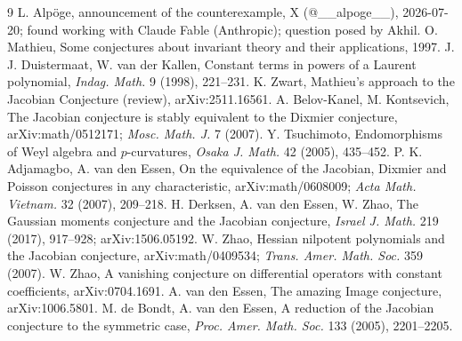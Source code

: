 \documentclass[11pt]{article}
\begin{document}
\begin{thebibliography}{9}
 L. Alp\"oge, announcement of the counterexample, X (@\_\_alpoge\_\_),
2026-07-20; found working with Claude Fable (Anthropic); question posed by Akhil.
 O. Mathieu, Some conjectures about invariant theory and their
applications, 1997.
 J. J. Duistermaat, W. van der Kallen, Constant terms in powers of a Laurent
polynomial, \emph{Indag. Math.} 9 (1998), 221--231.
 K. Zwart, Mathieu's approach to the Jacobian Conjecture (review),
arXiv:2511.16561.
 A. Belov-Kanel, M. Kontsevich, The Jacobian conjecture is stably equivalent
to the Dixmier conjecture, arXiv:math/0512171; \emph{Mosc. Math. J.} 7 (2007).
 Y. Tsuchimoto, Endomorphisms of Weyl algebra and $p$-curvatures,
\emph{Osaka J. Math.} 42 (2005), 435--452.
 P. K. Adjamagbo, A. van den Essen, On the equivalence of the Jacobian,
Dixmier and Poisson conjectures in any characteristic, arXiv:math/0608009; \emph{Acta Math.
Vietnam.} 32 (2007), 209--218.
 H. Derksen, A. van den Essen, W. Zhao, The Gaussian moments conjecture and
the Jacobian conjecture, \emph{Israel J. Math.} 219 (2017), 917--928; arXiv:1506.05192.
 W. Zhao, Hessian nilpotent polynomials and the Jacobian conjecture,
arXiv:math/0409534; \emph{Trans. Amer. Math. Soc.} 359 (2007).
 W. Zhao, A vanishing conjecture on differential operators with constant
coefficients, arXiv:0704.1691.
 A. van den Essen, The amazing Image conjecture, arXiv:1006.5801.
 M. de Bondt, A. van den Essen, A reduction of the Jacobian conjecture to
the symmetric case, \emph{Proc. Amer. Math. Soc.} 133 (2005), 2201--2205.
\end{thebibliography}
\end{document}
